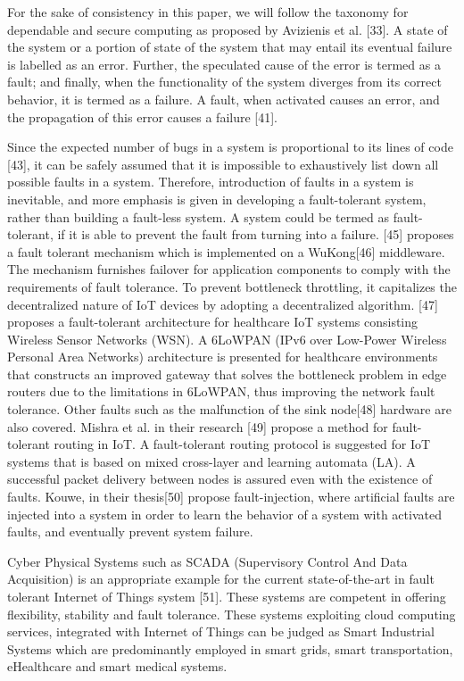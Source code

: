 For the sake of consistency in this paper, we will follow the taxonomy for dependable and secure computing as proposed by Avizienis et al. [33]. A state of the system or a portion of state of the system that may entail its eventual failure is labelled as an error. Further, the speculated cause of the error is termed as a fault; and finally, when the functionality of the system diverges from its correct behavior, it is termed as a failure. A fault, when activated causes an error, and the propagation of this error causes a failure [41]. 

Since the expected number of bugs in a system is proportional to its lines of code [43], it can be safely assumed that it is impossible to exhaustively list down all possible faults in a system. Therefore, introduction of faults in a system is inevitable, and more emphasis is given in developing a fault-tolerant system, rather than building a fault-less system. A system could be termed as fault-tolerant, if it is able to prevent the fault from turning into a failure. [45] proposes a fault tolerant mechanism which is implemented on a WuKong[46] middleware. The mechanism furnishes failover for application components to comply with the requirements of fault tolerance. To prevent bottleneck throttling, it capitalizes the decentralized nature of IoT devices by adopting a decentralized algorithm. [47] proposes a fault-tolerant architecture for healthcare IoT systems consisting Wireless Sensor Networks (WSN). A 6LoWPAN (IPv6 over Low-Power Wireless Personal Area Networks) architecture is presented for healthcare environments that constructs an improved gateway that solves the bottleneck problem in edge routers due to the limitations in 6LoWPAN, thus improving the network fault tolerance. Other faults such as the malfunction of the sink node[48] hardware are also covered. Mishra et al. in their research [49] propose a method for fault-tolerant routing in IoT. A fault-tolerant routing protocol is suggested for IoT systems that is based on mixed cross-layer and learning automata (LA). A successful packet delivery between nodes is assured even with the existence of faults. Kouwe, in their thesis[50] propose fault-injection, where artificial faults are injected into a system in order to learn the behavior of a system with activated faults, and eventually prevent system failure.

Cyber Physical Systems such as SCADA (Supervisory Control And Data Acquisition) is an appropriate example for the current state-of-the-art in fault tolerant Internet of Things system [51]. These systems are competent in offering flexibility, stability and fault tolerance. These systems exploiting cloud computing services, integrated with Internet of Things can be judged as Smart Industrial Systems which are predominantly employed in smart grids, smart transportation, eHealthcare and smart medical systems.

